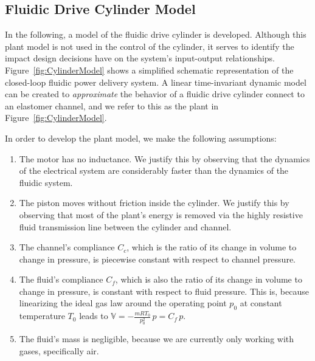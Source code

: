 \subsection{Fluidic Drive Cylinder Model}
\label{subsec:Power, Model}
In the following, a model of the fluidic drive cylinder is developed.
Although this plant model is not used in the control of the cylinder, it serves to identify the impact design decisions have on the system's input-output relationships.
Figure~\ref{fig:CylinderModel} shows a simplified schematic representation of the closed-loop fluidic power delivery system.
A linear time-invariant dynamic model can be created to \emph{approximate} the behavior of a fluidic drive cylinder connect to an elastomer channel, and we refer to this as the plant in Figure~\ref{fig:CylinderModel}.

In order to develop the plant model, we make the following assumptions:
\begin{enumerate}
  \item The motor has no inductance. We justify this by observing that the dynamics of the electrical system are considerably faster than the dynamics of the fluidic system.
  \item The piston moves without friction inside the cylinder. We justify this by observing that most of the plant's energy is removed via the highly resistive fluid transmission line between the cylinder and channel.
  \item The channel's compliance $C_c$, which is the ratio of its change in volume to change in pressure, is piecewise constant with respect to channel pressure.
  \item The fluid's compliance $C_f$, which is also the ratio of its change in volume to change in pressure, is constant with respect to fluid pressure. This is, because linearizing the ideal gas law around the operating point $p_0$ at constant temperature $T_0$ leads to $\mathbb{V} = -\frac{m R T_0}{p_0^2} \, p = C_f \, p$.
  \item The fluid's mass is negligible, because we are currently only working with gases, specifically air.
\end{enumerate}

